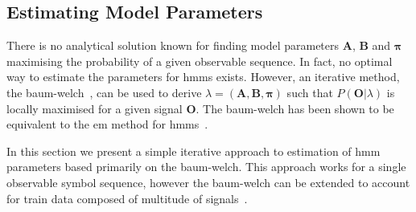 %   
%   
%   
%   
%

\subsection{Estimating Model Parameters}
\label{sec:baum-welch}
There is no analytical solution known for finding model parameters $\mathbf{A}$, $\mathbf{B}$ and $\boldsymbol{\pi}$ maximising the probability of a given observable sequence. In fact, no optimal way to estimate the parameters for \glspl{hmm} exists. However, an iterative method, the \gls{baum-welch}~\cite{baum1970}, can be used to derive $\lambda = (\mathbf{A}, \mathbf{B}, \boldsymbol{\pi})$ such that $P(\mathbf{O}|\lambda)$ is locally maximised for a given signal $\mathbf{O}$. The \gls{baum-welch} has been shown to be equivalent to the \gls{em} method for \glspl{hmm}~\cite{Dempster1977, wu1983}.

In this section we present a simple iterative approach to estimation of \gls{hmm} parameters based primarily on the \gls{baum-welch}. This approach works for a single observable symbol sequence, however the \gls{baum-welch} can be extended to account for train data composed of multitude of signals~\cite{Rabiner89hmm, levinson1983, li2000}.

